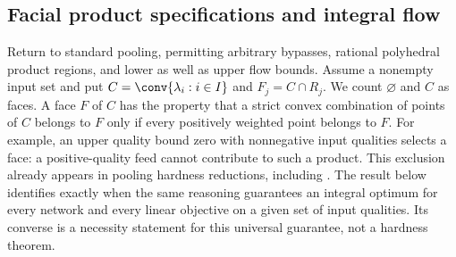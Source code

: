 \subsection{Facial product specifications and integral flow}\label{s1:faces}

Return to standard pooling, permitting arbitrary bypasses, rational
polyhedral product regions, and lower as well as upper flow bounds.
Assume a nonempty input set and put
$C=\conv\{\lambda_i:i\in I\}$ and $F_j=C\cap R_j$.
We count $\varnothing$ and $C$ as faces. A face $F$ of $C$ has the
property that a strict convex combination of points of $C$ belongs to
$F$ only if every positively weighted point belongs to $F$.
For example, an upper quality bound zero with nonnegative input
qualities selects a face: a positive-quality feed cannot contribute to
such a product. This exclusion already appears in pooling hardness
reductions, including \citet[Theorem~4]
{haugland2016-the-computational-complexity-of-the}. The result below
identifies exactly when the same reasoning guarantees an integral
optimum for every network and every linear objective on a given set of
input qualities. Its converse is a necessity statement for this
universal guarantee, not a hardness theorem.

